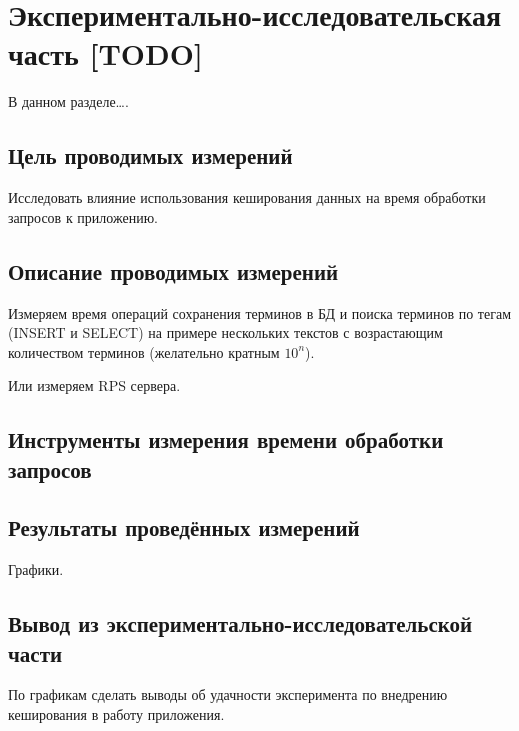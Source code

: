 \section{Экспериментально-исследовательская часть [TODO]}

В данном разделе\dots .

\subsection{Цель проводимых измерений}

Исследовать влияние использования кеширования данных на время обработки запросов к приложению. 


	
\subsection{Описание проводимых измерений}

Измеряем время операций сохранения терминов в БД и поиска терминов по тегам (INSERT и SELECT) на примере нескольких текстов с возрастающим количеством терминов (желательно кратным $10^n$).

Или измеряем RPS сервера.


	
\subsection{Инструменты измерения времени обработки запросов}


		
\subsection{Результаты проведённых измерений}

Графики.



\subsection{Вывод из экспериментально-исследовательской части}

По графикам сделать выводы об удачности эксперимента по внедрению кеширования в работу приложения.



\pagebreak